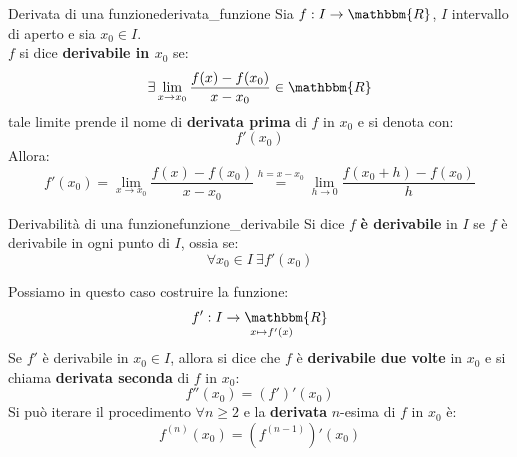 \documentclass[12pt]{report}
\newcounter{definition}
\newcommand{\nmu}{}
\begin{document}
 	\begin{definition}{\nmu Derivata di una funzione}{derivata_funzione}
 		Sia $f: I \to \mathbbm{R}$, $I$ intervallo di aperto e sia $x_0 \in I$. \\
 		$f$ si dice \textbf{derivabile in $x_0$} se: \[
 			\exists \lim_{x \to {x_0}}\dfrac{f(x) - f(x_0)}{x - x_0} \in \mathbbm{R}
 		\]
 		tale limite prende il nome di \textbf{derivata prima} di $f$ in $x_0$ e si denota con: \[f'(x_0)\] Allora:
 		\[
 		f'(x_0) = \lim_{x \to {x_0}}\dfrac{f(x) - f(x_0)}{x - x_0} \overset{h = x - x_0}{=}\lim_{h \to 0}\dfrac{f(x_0 + h) - f(x_0)}{h}
 		\]
 	\end{definition}
 	\begin{note}{\nmu Derivabilità di una funzione}{funzione_derivabile}
 		Si dice $f$ \textbf{è derivabile} in $I$ se $f$ è derivabile in ogni punto di $I$, ossia se:
 		\[
 		\forall x_0 \in I\ \exists f'(x_0)
 		\]
 	\end{note}
 	Possiamo in questo caso costruire la funzione:
 	\[
 	f': \underset{x \mapsto f'(x)}{I \to \mathbbm{R}}
 	\]
 	Se $f'$ è derivabile in $x_0 \in I$, allora si dice che $f$ è \textbf{derivabile due volte} in $x_0$ e si chiama \textbf{derivata seconda} di $f$ in $x_0$:
 	\[
 	f''(x_0) = (f')'(x_0)
 	\]
 	Si può iterare il procedimento $\forall n \geq 2$ e la \textbf{derivata} $n$-esima di $f$ in $x_0$ è:
 	\[
 	f^{(n)}(x_0) = (f^{(n - 1)})'(x_0)
 	\]
\end{document}
